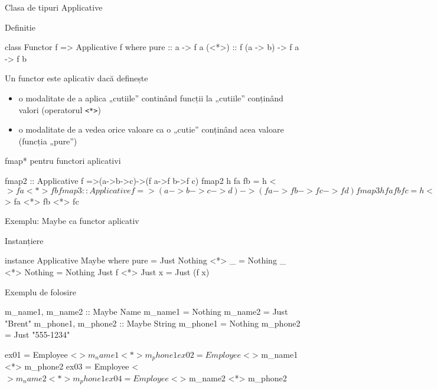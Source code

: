 \documentclass[xcolor=pdftex,romanian,colorlinks]{beamer}
\begin{document}
\begin{frame}[fragile]{Clasa de tipuri Applicative}
\begin{block}{Definitie}
\vspace{-1ex}
\begin{asciihs}
class Functor f => Applicative f where
  pure  :: a -> f a
  (<*>) :: f (a -> b) -> f a -> f b
\end{asciihs}
\vspace{-1ex}
Un functor este aplicativ dacă definește 
\begin{itemize}
\item o modalitate de a aplica „cutiile” continând funcții la „cutiile” conținând valori (operatorul \lstinline$<*>$)
\item o modalitate de a vedea orice valoare ca o „cutie” conținând acea valoare (funcția „pure”)
\end{itemize}
\end{block}

\begin{block}{fmap* pentru functori aplicativi}
\vspace{-1ex}
\begin{asciihs}
fmap2 :: Applicative f =>(a->b->c)->(f a->f b->f c)
fmap2 h fa fb = h <$> fa <*> fb

fmap3 :: Applicative f =>(a->b->c->d)->(f a->f b->f c->f d)
fmap3 h fa fb fc = h <$> fa <*> fb <*> fc
\end{asciihs}
\vspace{-1ex}
\end{block}
\end{frame}

\begin{frame}[fragile]{Exemplu: Maybe ca functor aplicativ}
\begin{block}{Instanțiere}
\vspace{-1.5ex}
\begin{asciihs}
instance Applicative Maybe where
  pure              = Just
  Nothing <*> _     = Nothing
  _ <*> Nothing     = Nothing
  Just f <*> Just x = Just (f x)
\end{asciihs}
\vspace{-1ex}
\end{block}
\begin{block}{Exemplu de folosire}
\vspace{-1.5ex}
\begin{asciihs}
m_name1, m_name2 :: Maybe Name
m_name1 = Nothing                 m_name2 = Just "Brent"
m_phone1, m_phone2 :: Maybe String
m_phone1 = Nothing                m_phone2 = Just "555-1234"

ex01 = Employee <$> m_name1 <*> m_phone1
ex02 = Employee <$> m_name1 <*> m_phone2
ex03 = Employee <$> m_name2 <*> m_phone1
ex04 = Employee <$> m_name2 <*> m_phone2
\end{asciihs}
\end{block}
\end{frame}
\end{document}
